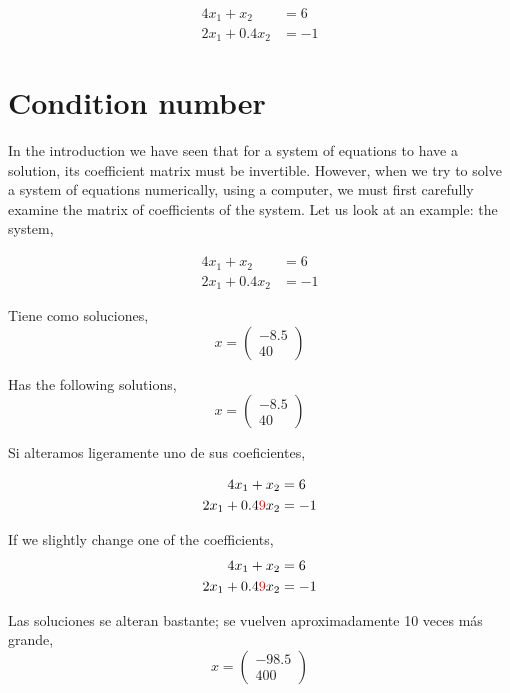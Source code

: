 \begin{paracol}{2}
\begin{align*}
4x_1+x_2&=6\\
2x_1+0.4 x_2&=-1
\end{align*}

\switchcolumn
\section{Condition number}
In the introduction we have seen that for a system of equations to have a solution, its coefficient matrix must be invertible. However, when we try to solve a system of equations numerically, using a computer, we must first carefully examine the matrix of coefficients of the system. Let us look at an example: the system,

\begin{align*}
4x_1+x_2&=6\\
2x_1+0.4 x_2&=-1
\end{align*}

\switchcolumn

Tiene como soluciones,
\begin{equation*}
x=\begin{pmatrix}
-8.5\\
40
\end{pmatrix}
\end{equation*}

\switchcolumn
 Has the following solutions,
 \begin{equation*}
x=\begin{pmatrix}
-8.5\\
40
\end{pmatrix}
\end{equation*}

\switchcolumn

Si alteramos ligeramente uno de sus coeficientes,

\begin{align*}
4x_1+x_2&=6\\
2x_1+0.4{\color{red}9} x_2&=-1
\end{align*}

\switchcolumn

If we slightly change one of the coefficients,
\begin{align*}
4x_1+x_2&=6\\
2x_1+0.4{\color{red}9} x_2&=-1
\end{align*}

\switchcolumn

Las soluciones se alteran bastante;  se vuelven aproximadamente 10 veces más grande,
\begin{equation*}
x=\begin{pmatrix}
-98.5\\
400
\end{pmatrix}
\end{equation*}


\end{paracol}
